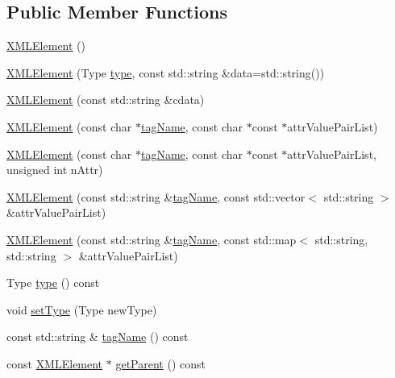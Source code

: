 \subsection*{Public Member Functions}
\begin{DoxyCompactItemize}
\item 
\hyperlink{classXMLDOM_1_1XMLElement_ae6e0c3440c60484c1fa97e06efdae280}{X\+M\+L\+Element} ()
\item 
\hyperlink{classXMLDOM_1_1XMLElement_a9eb89ab0895b7538d8be3870d21d46d8}{X\+M\+L\+Element} (Type \hyperlink{classXMLDOM_1_1XMLElement_ac6abb91539f92aacb495162199a8c610}{type}, const std\+::string \&data=std\+::string())
\item 
\hyperlink{classXMLDOM_1_1XMLElement_a5e35b4c34b54ca37b8f9d61e39c905d8}{X\+M\+L\+Element} (const std\+::string \&cdata)
\item 
\hyperlink{classXMLDOM_1_1XMLElement_ad2bf1d99f6ba83c870f546f3a4e6aa78}{X\+M\+L\+Element} (const char $\ast$\hyperlink{classXMLDOM_1_1XMLElement_a4f51bcc83b35ed12e2b776085835a369}{tag\+Name}, const char $\ast$const $\ast$attr\+Value\+Pair\+List)
\item 
\hyperlink{classXMLDOM_1_1XMLElement_afd5abcb481eac86977df3b2e763c5601}{X\+M\+L\+Element} (const char $\ast$\hyperlink{classXMLDOM_1_1XMLElement_a4f51bcc83b35ed12e2b776085835a369}{tag\+Name}, const char $\ast$const $\ast$attr\+Value\+Pair\+List, unsigned int n\+Attr)
\item 
\hyperlink{classXMLDOM_1_1XMLElement_a161545cdaa7937cf5b6fb5511cef6728}{X\+M\+L\+Element} (const std\+::string \&\hyperlink{classXMLDOM_1_1XMLElement_a4f51bcc83b35ed12e2b776085835a369}{tag\+Name}, const std\+::vector$<$ std\+::string $>$ \&attr\+Value\+Pair\+List)
\item 
\hyperlink{classXMLDOM_1_1XMLElement_a6f2525c1773adb68912a274c076d0ff6}{X\+M\+L\+Element} (const std\+::string \&\hyperlink{classXMLDOM_1_1XMLElement_a4f51bcc83b35ed12e2b776085835a369}{tag\+Name}, const std\+::map$<$ std\+::string, std\+::string $>$ \&attr\+Value\+Pair\+List)
\item 
Type \hyperlink{classXMLDOM_1_1XMLElement_ac6abb91539f92aacb495162199a8c610}{type} () const 
\item 
void \hyperlink{classXMLDOM_1_1XMLElement_a6341f47796d6516478d239c5733ec995}{set\+Type} (Type new\+Type)
\item 
const std\+::string \& \hyperlink{classXMLDOM_1_1XMLElement_a4f51bcc83b35ed12e2b776085835a369}{tag\+Name} () const 
\item 
const \hyperlink{classXMLDOM_1_1XMLElement}{X\+M\+L\+Element} $\ast$ \hyperlink{classXMLDOM_1_1XMLElement_a84a1700aeaa8dee143ac58ccd2027b4e}{get\+Parent} () const 

\end{DoxyCompactItemize}
